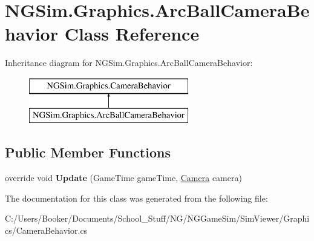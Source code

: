 \hypertarget{class_n_g_sim_1_1_graphics_1_1_arc_ball_camera_behavior}{}\section{N\+G\+Sim.\+Graphics.\+Arc\+Ball\+Camera\+Behavior Class Reference}
\label{class_n_g_sim_1_1_graphics_1_1_arc_ball_camera_behavior}
Inheritance diagram for N\+G\+Sim.\+Graphics.\+Arc\+Ball\+Camera\+Behavior\+:\begin{figure}[H]
\begin{center}
\leavevmode
\includegraphics[height=2.000000cm]{class_n_g_sim_1_1_graphics_1_1_arc_ball_camera_behavior}
\end{center}
\end{figure}
\subsection*{Public Member Functions}
\begin{DoxyCompactItemize}
\item 
\mbox{\label{class_n_g_sim_1_1_graphics_1_1_arc_ball_camera_behavior_af7b573d8a0b8b3b1aac05e0ae976c5a7}} 
override void {\bfseries Update} (Game\+Time game\+Time, \hyperlink{class_n_g_sim_1_1_graphics_1_1_camera}{Camera} camera)
\end{DoxyCompactItemize}


The documentation for this class was generated from the following file\+:\begin{DoxyCompactItemize}
\item 
C\+:/\+Users/\+Booker/\+Documents/\+School\+\_\+\+Stuff/\+N\+G/\+N\+G\+Game\+Sim/\+Sim\+Viewer/\+Graphics/Camera\+Behavior.\+cs\end{DoxyCompactItemize}
